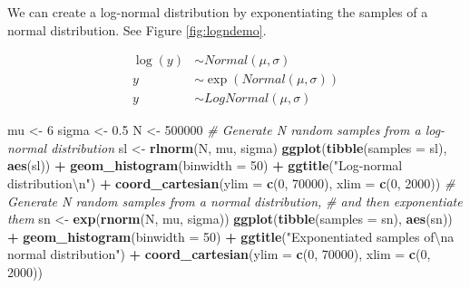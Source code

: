 \documentclass[12pt,]{krantz}
\newenvironment{Shaded}{\begin{snugshade}}{\end{snugshade}}
\newcommand{\CharTok}[1]{\textcolor[rgb]{0.31,0.60,0.02}{#1}}
\newcommand{\CommentTok}[1]{\textcolor[rgb]{0.56,0.35,0.01}{\textit{#1}}}
\newcommand{\DataTypeTok}[1]{\textcolor[rgb]{0.13,0.29,0.53}{#1}}
\newcommand{\DecValTok}[1]{\textcolor[rgb]{0.00,0.00,0.81}{#1}}
\newcommand{\FloatTok}[1]{\textcolor[rgb]{0.00,0.00,0.81}{#1}}
\newcommand{\KeywordTok}[1]{\textcolor[rgb]{0.13,0.29,0.53}{\textbf{#1}}}
\newcommand{\NormalTok}[1]{#1}
\newcommand{\OperatorTok}[1]{\textcolor[rgb]{0.81,0.36,0.00}{\textbf{#1}}}
\newcommand{\StringTok}[1]{\textcolor[rgb]{0.31,0.60,0.02}{#1}}
\theoremstyle{definition}
\theoremstyle{definition}
\theoremstyle{definition}
\theoremstyle{remark}
\begin{document}
We can create a log-normal distribution by exponentiating the samples of a normal distribution. See Figure \ref{fig:logndemo}.

\begin{equation}
\begin{aligned}
\log(y) &\sim Normal( \mu, \sigma)\\
y &\sim \exp(Normal( \mu, \sigma)) \\
y &\sim LogNormal( \mu, \sigma)
\end{aligned}
\end{equation}

\begin{Shaded}
\begin{Highlighting}[]
\NormalTok{mu <-}\StringTok{ }\DecValTok{6}
\NormalTok{sigma <-}\StringTok{ }\FloatTok{0.5}
\NormalTok{N <-}\StringTok{ }\DecValTok{500000}
\CommentTok{# Generate N random samples from a log-normal distribution}
\NormalTok{sl <-}\StringTok{ }\KeywordTok{rlnorm}\NormalTok{(N, mu, sigma)}
\KeywordTok{ggplot}\NormalTok{(}\KeywordTok{tibble}\NormalTok{(}\DataTypeTok{samples =}\NormalTok{ sl), }\KeywordTok{aes}\NormalTok{(sl)) }\OperatorTok{+}
\StringTok{  }\KeywordTok{geom_histogram}\NormalTok{(}\DataTypeTok{binwidth =} \DecValTok{50}\NormalTok{) }\OperatorTok{+}
\StringTok{  }\KeywordTok{ggtitle}\NormalTok{(}\StringTok{"Log-normal distribution}\CharTok{\textbackslash{}n}\StringTok{"}\NormalTok{) }\OperatorTok{+}
\StringTok{  }\KeywordTok{coord_cartesian}\NormalTok{(}\DataTypeTok{ylim =} \KeywordTok{c}\NormalTok{(}\DecValTok{0}\NormalTok{, }\DecValTok{70000}\NormalTok{), }\DataTypeTok{xlim =} \KeywordTok{c}\NormalTok{(}\DecValTok{0}\NormalTok{, }\DecValTok{2000}\NormalTok{))}
\CommentTok{# Generate N random samples from a normal distribution,}
\CommentTok{# and then exponentiate them}
\NormalTok{sn <-}\StringTok{ }\KeywordTok{exp}\NormalTok{(}\KeywordTok{rnorm}\NormalTok{(N, mu, sigma))}
\KeywordTok{ggplot}\NormalTok{(}\KeywordTok{tibble}\NormalTok{(}\DataTypeTok{samples =}\NormalTok{ sn), }\KeywordTok{aes}\NormalTok{(sn)) }\OperatorTok{+}
\StringTok{  }\KeywordTok{geom_histogram}\NormalTok{(}\DataTypeTok{binwidth =} \DecValTok{50}\NormalTok{) }\OperatorTok{+}
\StringTok{  }\KeywordTok{ggtitle}\NormalTok{(}\StringTok{"Exponentiated samples of}\CharTok{\textbackslash{}n}\StringTok{a normal distribution"}\NormalTok{) }\OperatorTok{+}
\StringTok{    }\KeywordTok{coord_cartesian}\NormalTok{(}\DataTypeTok{ylim =} \KeywordTok{c}\NormalTok{(}\DecValTok{0}\NormalTok{, }\DecValTok{70000}\NormalTok{), }\DataTypeTok{xlim =} \KeywordTok{c}\NormalTok{(}\DecValTok{0}\NormalTok{, }\DecValTok{2000}\NormalTok{))}
\end{Highlighting}
\end{Shaded}
\end{document}
